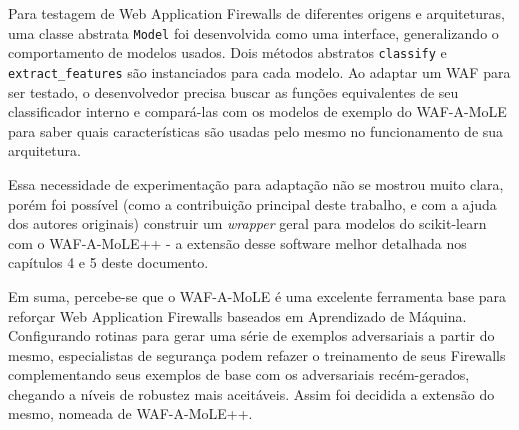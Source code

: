 Para testagem de Web Application Firewalls de diferentes origens e arquiteturas, uma classe abstrata \verb+Model+ foi desenvolvida como uma interface, generalizando o comportamento de modelos usados. Dois métodos abstratos \verb+classify+ e \verb+extract_features+ são instanciados para cada modelo. Ao adaptar um WAF para ser testado, o desenvolvedor precisa buscar as funções equivalentes de seu classificador interno e compará-las com os modelos de exemplo do WAF-A-MoLE para saber quais características são usadas pelo mesmo no funcionamento de sua arquitetura.

Essa necessidade de experimentação para adaptação não se mostrou muito clara, porém foi possível (como a contribuição principal deste trabalho, e com a ajuda dos autores originais) construir um \textit{wrapper} geral para modelos do scikit-learn com o WAF-A-MoLE++ - a extensão desse software melhor detalhada nos capítulos 4 e 5 deste documento.

Em suma, percebe-se que o WAF-A-MoLE é uma excelente ferramenta base para reforçar Web Application Firewalls baseados em Aprendizado de Máquina. Configurando rotinas para gerar uma série de exemplos adversariais a partir do mesmo, especialistas de segurança podem refazer o treinamento de seus Firewalls complementando seus exemplos de base com os adversariais recém-gerados, chegando a níveis de robustez mais aceitáveis. Assim foi decidida a extensão do mesmo, nomeada de WAF-A-MoLE++.



